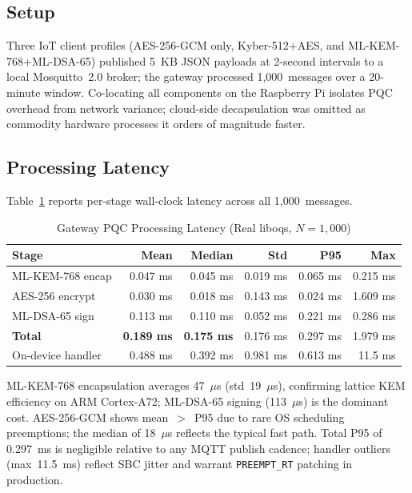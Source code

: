 \documentclass[conference]{IEEEtran}
\begin{document}
\subsection{Setup}

Three IoT client profiles (AES-256-GCM only, Kyber-512+AES, and ML-KEM-768+ML-DSA-65) published 5~KB JSON payloads at 2-second intervals to a local Mosquitto~2.0 broker; the gateway processed 1,000~messages over a 20-minute window. Co-locating all components on the Raspberry Pi isolates PQC overhead from network variance; cloud-side decapsulation was omitted as commodity hardware processes it orders of magnitude faster.

\subsection{Processing Latency}

Table~\ref{tab:timing} reports per-stage wall-clock latency across all 1,000~messages.

\begin{table}[!t]
\centering
\captionsetup{font=footnotesize, skip=2pt}
\caption{Gateway PQC Processing Latency (Real liboqs, $N=1{,}000$)}
\label{tab:timing}
\footnotesize
\setlength{\tabcolsep}{3pt}
\begin{tabular}{lrrrrr}
\toprule
\textbf{Stage} & \textbf{Mean} & \textbf{Median} & \textbf{Std} & \textbf{P95} & \textbf{Max} \\
\midrule
ML-KEM-768 encap & 0.047 ms & 0.045 ms & 0.019 ms & 0.065 ms & 0.215 ms \\
AES-256 encrypt  & 0.030 ms & 0.018 ms & 0.143 ms & 0.024 ms & 1.609 ms \\
ML-DSA-65 sign   & 0.113 ms & 0.110 ms & 0.052 ms & 0.221 ms & 0.286 ms \\
\midrule
\textbf{Total}        & \textbf{0.189 ms} & \textbf{0.175 ms} & 0.176 ms & 0.297 ms & 1.979 ms \\
On-device handler     & 0.488 ms & 0.392 ms & 0.981 ms & 0.613 ms & 11.5 ms \\
\bottomrule
\end{tabular}
\vspace{-3mm}
\end{table}

ML-KEM-768 encapsulation averages 47~$\mu$s (std~19~$\mu$s), confirming lattice KEM efficiency on ARM Cortex-A72; ML-DSA-65 signing (113~$\mu$s) is the dominant cost. AES-256-GCM shows mean~$>$~P95 due to rare OS scheduling preemptions; the median of 18~$\mu$s reflects the typical fast path. Total P95 of 0.297~ms is negligible relative to any MQTT publish cadence; handler outliers (max~11.5~ms) reflect SBC jitter and warrant \texttt{PREEMPT\_RT} patching in production.
\end{document}
